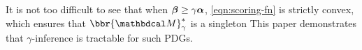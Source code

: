 \documentclass[twoside]{article}
\newcommand\discard[1]{}
\begin{document}
It is not too difficult to see that when $\boldsymbol\beta \ge \gamma\boldsymbol\alpha$, 
 \eqref{eqn:scoring-fn} is strictly convex, which ensures that
 $\bbr{\dg M}^*_\gamma$ is a singleton
This paper demonstrates
 that $\gamma$-inference is tractable for such PDGs.
%
\discard{%
    The former is a notational convenience,
    because for $\gamma \in (0, \infty)$,
    $\gamma$-inference is just $1$-inference for a
    slightly different PDG:
    $\bbr{
        \balpha, \bbeta}^*_\gamma = \bbr{
        \gamma \balpha, \bbeta}^*_1$.
    This paper demonstrates the tractability of
    1-inference for the specific case of PDGs satisfying $\bbeta \ge \balpha$, which is sufficient to ensure strict convexity of \eqref{eqn:scoring-fn}, and hence a unique optimal distribution.}%
\end{document}
